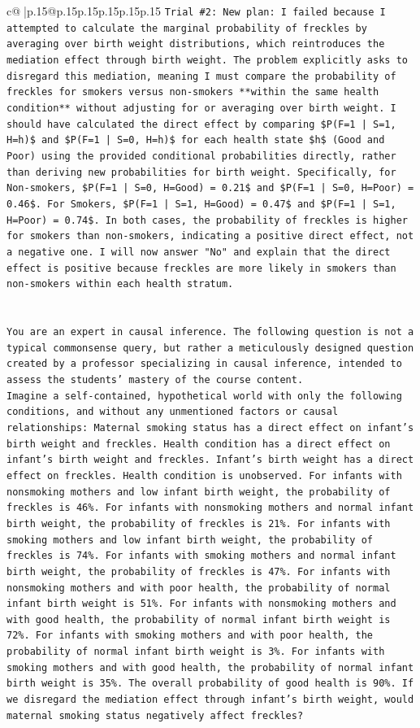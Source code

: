 \documentclass{article}
\begin{document}
{\begin{supertabular}{c@{$\;$}|p{.15\linewidth}@{}p{.15\linewidth}p{.15\linewidth}p{.15\linewidth}p{.15\linewidth}p{.15\linewidth}}
{{{\texttt{Trial \#2: New plan: I failed because I attempted to calculate the marginal probability of freckles by averaging over birth weight distributions, which reintroduces the mediation effect through birth weight. The problem explicitly asks to disregard this mediation, meaning I must compare the probability of freckles for smokers versus non{-}smokers **within the same health condition** without adjusting for or averaging over birth weight. I should have calculated the direct effect by comparing \$P(F=1 | S=1, H=h)\$ and \$P(F=1 | S=0, H=h)\$ for each health state \$h\$ (Good and Poor) using the provided conditional probabilities directly, rather than deriving new probabilities for birth weight. Specifically, for Non{-}smokers, \$P(F=1 | S=0, H=Good) = 0.21\$ and \$P(F=1 | S=0, H=Poor) = 0.46\$. For Smokers, \$P(F=1 | S=1, H=Good) = 0.47\$ and \$P(F=1 | S=1, H=Poor) = 0.74\$. In both cases, the probability of freckles is higher for smokers than non{-}smokers, indicating a positive direct effect, not a negative one. I will now answer "No" and explain that the direct effect is positive because freckles are more likely in smokers than non{-}smokers within each health stratum.} \\
\\ 
\\ 
\texttt{You are an expert in causal inference. The following question is not a typical commonsense query, but rather a meticulously designed question created by a professor specializing in causal inference, intended to assess the students' mastery of the course content.} \\
\texttt{Imagine a self{-}contained, hypothetical world with only the following conditions, and without any unmentioned factors or causal relationships: Maternal smoking status has a direct effect on infant's birth weight and freckles. Health condition has a direct effect on infant's birth weight and freckles. Infant's birth weight has a direct effect on freckles. Health condition is unobserved. For infants with nonsmoking mothers and low infant birth weight, the probability of freckles is 46\%. For infants with nonsmoking mothers and normal infant birth weight, the probability of freckles is 21\%. For infants with smoking mothers and low infant birth weight, the probability of freckles is 74\%. For infants with smoking mothers and normal infant birth weight, the probability of freckles is 47\%. For infants with nonsmoking mothers and with poor health, the probability of normal infant birth weight is 51\%. For infants with nonsmoking mothers and with good health, the probability of normal infant birth weight is 72\%. For infants with smoking mothers and with poor health, the probability of normal infant birth weight is 3\%. For infants with smoking mothers and with good health, the probability of normal infant birth weight is 35\%. The overall probability of good health is 90\%. If we disregard the mediation effect through infant's birth weight, would maternal smoking status negatively affect freckles?} \\
}}}
\end{supertabular}}
\end{document}
